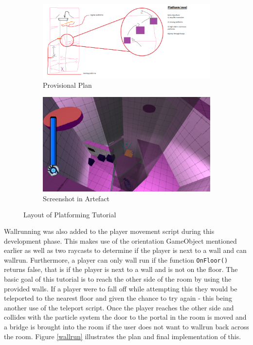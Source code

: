 \begin{figure}[H]
\centering
\begin{subfigure}{0.45\textwidth}
  \centering
  \includegraphics[width=1\linewidth]{Figures/platformplan.png}
  \caption{Provisional Plan}
\end{subfigure}%
\begin{subfigure}{0.45\textwidth}
  \centering
  \includegraphics[width=1\linewidth]{Figures/platform.png}
  \caption{Screenshot in Artefact}
\end{subfigure}
\caption{Layout of Platforming Tutorial}
\label{platty}
\end{figure}

\noindent Wallrunning was also added to the player movement script during this development phase. This makes use of the orientation GameObject mentioned earlier as well as two raycasts to determine if the player is next to a wall and can wallrun. Furthermore, a player can only wall run if the function \texttt{OnFloor()} returns false, that is if the player is next to a wall and is not on the floor. The basic goal of this tutorial is to reach the other side of the room by using the provided walls. If a player were to fall off while attempting this they would be teleported to the nearest floor and given the chance to try again - this being another use of the teleport script. Once the player reaches the other side and collides with the particle system the door to the portal in the room is moved and a bridge is brought into the room if the user does not want to wallrun back across the room. Figure \ref{wallrun} illustrates the plan and final implementation of this. 

